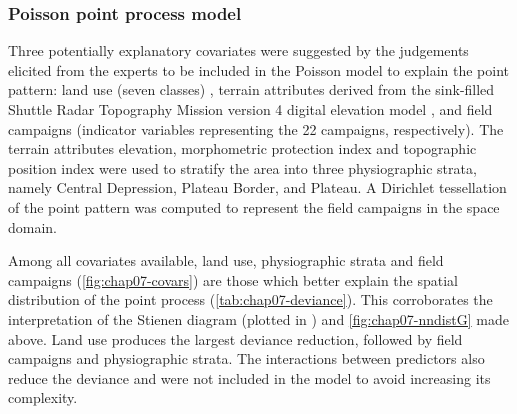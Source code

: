 \subsubsection{Poisson point process model}

Three potentially explanatory covariates were suggested by the judgements elicited from the experts to be 
included in the Poisson model to explain the point pattern: land use (seven classes) 
\cite{SamuelRosaEtAl2011a}, terrain attributes derived from the sink-filled Shuttle Radar Topography Mission 
version \num{4} digital elevation model \cite{ReuterEtAl2007}, and field campaigns (indicator variables 
representing the 22 campaigns, respectively). The terrain attributes elevation, morphometric protection index 
and topographic position index were used to stratify the area into three physiographic strata, namely Central 
Depression, Plateau Border, and Plateau. A Dirichlet tessellation of the point pattern was computed to 
represent the field campaigns 
in the space domain.

Among all covariates available, land use, physiographic strata and field campaigns 
(\autoref{fig:chap07-covars}) are those which better explain the spatial distribution of the point process 
(\autoref{tab:chap07-deviance}). This corroborates the interpretation of the Stienen diagram (plotted in 
\googleearth) and \autoref{fig:chap07-nndistG} made above. Land use produces the largest deviance 
reduction, followed by field campaigns and physiographic strata. The interactions between predictors also 
reduce the deviance and were not included in the model to avoid increasing its complexity.

